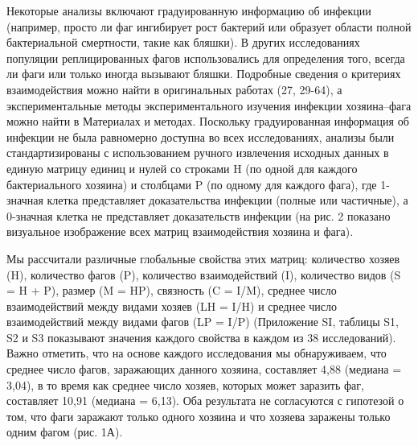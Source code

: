 \documentclass[a4paper,12pt]{article}
\begin{document}
    \par{Некоторые анализы включают градуированную информацию об инфекции (например, просто ли фаг ингибирует рост
    бактерий или образует области полной бактериальной смертности, такие как бляшки). В других исследованиях популяции
    реплицированных фагов использовались для определения того, всегда ли фаги или только иногда вызывают бляшки.
    Подробные сведения о критериях взаимодействия можно найти в оригинальных работах (27, 29-64), а экспериментальные
    методы экспериментального изучения инфекции хозяина–фага можно найти в Материалах и методах. Поскольку
    градуированная информация об инфекции не была равномерно доступна во всех исследованиях, анализы были
    стандартизированы с использованием ручного извлечения исходных данных в единую матрицу единиц и нулей со строками H
    (по одной для каждого бактериального хозяина) и столбцами P (по одному для каждого фага), где 1-значная клетка
    представляет доказательства инфекции (полные или частичные), а 0-значная клетка не представляет доказательств
    инфекции (на рис. 2 показано визуальное изображение всех матриц взаимодействия хозяина и фага).}
    
    \par{Мы рассчитали различные глобальные свойства этих матриц: количество хозяев (H), количество фагов (P),
    количество взаимодействий (I), количество видов (S = H + P), размер (M = HP), связность (C = I/M), среднее число
    взаимодействий между видами хозяев (LH = I/H) и среднее число взаимодействий между видами фагов (LP = I/P)
    (Приложение SI, таблицы S1, S2 и S3 показывают значения каждого свойства в каждом из 38 исследований). Важно
    отметить, что на основе каждого исследования мы обнаруживаем, что среднее число фагов, заражающих данного хозяина,
    составляет 4,88 (медиана = 3,04), в то время как среднее число хозяев, которых может заразить фаг, составляет 10,91
    (медиана = 6,13). Оба результата не согласуются с гипотезой о том, что фаги заражают только одного хозяина и что
    хозяева заражены только одним фагом (рис. 1А).}
    
\end{document}
